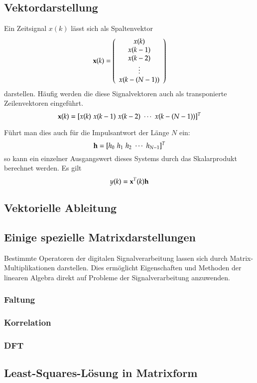 \subsection{Vektordarstellung}
Ein Zeitsignal $x(k)$ lässt sich als Spaltenvektor
\[
\mathbf{x}(k) = \left(
  \begin{array}{c}
    x(k) \\
    x(k-1) \\
    x(k-2) \\
    \vdots \\
    x(k-(N-1)) \\
  \end{array}
\right)
\]
darstellen. Häufig werden die diese Signalvektoren auch als
transponierte Zeilenvektoren eingeführt.
\[
\mathbf{x}(k) = [x(k) \,\, x(k-1) \,\, x(k-2) \,\, \cdots
\,\,x(k-(N-1)) ]^T
\]

Führt man dies auch für die Impulsantwort der Länge $N$ ein:
\[
    \mathbf{h} = [h_0 \,\, h_1 \,\, h_2 \,\, \cdots
\,\,h_{N-1} ]^T
\]
so kann ein einzelner Ausgangswert dieses Systems durch das
Skalarprodukt berechnet werden. Es gilt
\[
    y(k) = \mathbf{x}^T(k)\mathbf{h}
\]

\subsection{Vektorielle Ableitung}
\subsection{Einige spezielle Matrixdarstellungen}
Bestimmte Operatoren der digitalen Signalverarbeitung lassen sich
durch Matrix-Multiplikationen darstellen. Dies ermöglicht
Eigenschaften und Methoden der linearen Algebra direkt auf Probleme
der Signalverarbeitung anzuwenden.

\subsubsection{Faltung}

\subsubsection{Korrelation}
\subsubsection{DFT}

\subsection{Least-Squares-Lösung in Matrixform}


